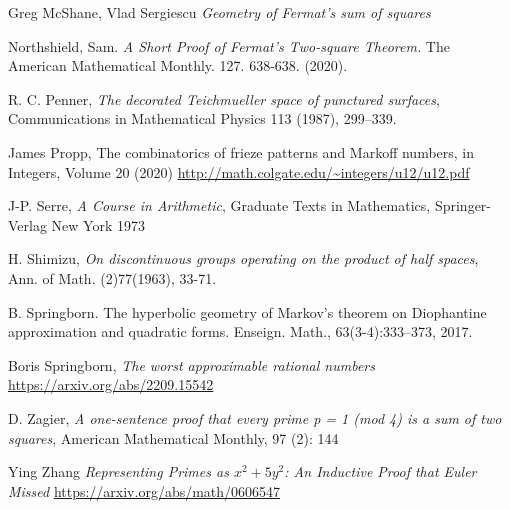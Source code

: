 \documentclass[12pt,a4paper]{amsart}
\begin{document}
Greg McShane, Vlad Sergiescu
\textit{Geometry of Fermat's sum of squares}

Northshield, Sam. 
\textit{A Short Proof of Fermat’s Two-square Theorem.} The American Mathematical Monthly. 127. 638-638. (2020). 


R. C. Penner, 
\textit{The decorated Teichmueller space of punctured surfaces}, 
Communications in Mathematical Physics 113 (1987), 299–339.


James Propp,
The combinatorics of frieze patterns and Markoff numbers,
in  Integers, Volume 20 (2020)
\url{http://math.colgate.edu/~integers/u12/u12.pdf}


J-P. Serre,
\textit{A Course in Arithmetic},
Graduate Texts in Mathematics,
Springer-Verlag New York
1973

H. Shimizu, 
\textit{On discontinuous groups operating on the product of half spaces}, Ann. of Math. (2)77(1963), 33-71.



B. Springborn. The hyperbolic geometry of Markov’s theorem on Diophantine
approximation and quadratic forms. Enseign. Math., 63(3-4):333–373, 2017.

Boris Springborn,
\textit{The worst approximable rational numbers}
\url{https://arxiv.org/abs/2209.15542}



D. Zagier,
 \textit{A one-sentence proof that every prime p = 1 (mod 4) is a sum of two squares}, 
 American Mathematical Monthly, 97 (2): 144
 
Ying Zhang
\textit{Representing Primes as $x^2 + 5y^2$: An Inductive Proof that Euler Missed}
\url{https://arxiv.org/abs/math/0606547}


 
\end{document}
